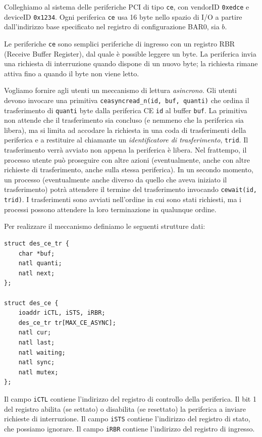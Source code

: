 Colleghiamo al sistema delle periferiche PCI di tipo \verb|ce|, con vendorID \verb|0xedce| e deviceID \verb|0x1234|.
Ogni periferica \verb|ce| usa 16 byte nello spazio di I/O a partire dall'indirizzo base specificato nel
registro di configurazione BAR0, sia $b$.

Le periferiche \verb|ce| sono semplici periferiche di ingresso con un registro RBR (Receive Buffer Register),
dal quale \`e possible leggere un byte.
La periferica invia una richiesta di
interruzione quando dispone di un nuovo byte; la richiesta rimane attiva fino a quando il byte non viene letto.

Vogliamo fornire agli utenti un meccanismo di lettura {\em asincrono}. Gli utenti devono invocare una primitiva
\verb|ceasyncread_n(id, buf, quanti)| che ordina il trasferimento di \verb|quanti| byte dalla periferica CE \verb|id|
al buffer \verb|buf|. La primitiva non attende che il trasferimento sia concluso (e nemmeno che la periferica sia libera),
ma si limita ad accodare la richiesta in una coda di trasferimenti della periferica e a restituire al chiamante un 
{\em identificatore di trasferimento}, \verb|trid|. Il trasferimento verr\`a avviato
non appena la periferica \`e libera. Nel frattempo, il processo utente pu\`o proseguire con altre azioni (eventualmente,
anche con altre richieste di trasferimento, anche sulla stessa periferica). In un secondo momento, un processo
(eventualmente anche diverso da quello che aveva iniziato il trasferimento) potr\`a attendere il termine del trasferimento
invocando \verb|cewait(id, trid)|. I trasferimenti sono avviati nell'ordine in cui sono stati richiesti, ma i processi
possono attendere la loro terminazione in qualunque ordine.

Per realizzare il meccanismo definiamo le seguenti strutture dati:
\begin{verbatim}
struct des_ce_tr {
    char *buf;
    natl quanti;
    natl next;
};

struct des_ce {
    ioaddr iCTL, iSTS, iRBR;
    des_ce_tr tr[MAX_CE_ASYNC];
    natl cur;
    natl last;
    natl waiting;
    natl sync;
    natl mutex;
};
\end{verbatim}
Il campo \verb|iCTL| contiene l'indirizzo del registro di controllo della periferica. Il bit 1 del registro
abilita (se settato) o disabilita (se resettato) la periferica a inviare richieste di interruzione.
Il campo \verb|iSTS| contiene l'indirizzo del registro di stato, che possiamo ignorare. Il campo \verb|iRBR|
contiene l'indirizzo del registro di ingresso.

